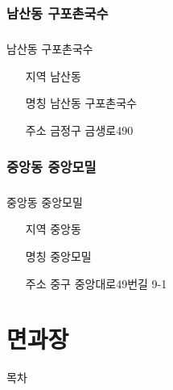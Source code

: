 \documentclass[aspectratio=1610,17pt,xcolor=pdftex,dvipsnames,table,handout]{beamer}
\begin{document}
		\section{ 남산동 구포촌국수	}
		\begin{frame} [t,plain]
		\frametitle{ }
			\begin{block} {	남산동 구포촌국수	}
			\setlength{\leftmargini}{4em}			
			\begin{itemize}
				\item [지역] 남산동	
				\item [명칭] 남산동 구포촌국수	
				\item [주소] 금정구 금생로490
			\end{itemize}
			\end{block}						
		\end{frame}						


		\section{ 중앙동 중앙모밀	}
		\begin{frame} [t,plain]
		\frametitle{ }
			\begin{block} {	중앙동 중앙모밀	}
			\setlength{\leftmargini}{4em}			
			\begin{itemize}
				\item [지역] 중앙동	
				\item [명칭] 중앙모밀	
				\item [주소] 중구 중앙대로49번길 9-1
			\end{itemize}
			\end{block}						
		\end{frame}						




		\part{ 면과장 }
		\frame{\partpage}

		\begin{frame} [plain]{목차}
		\tableofcontents%

\label{part2} 	%

		\end{frame}
		
\end{document}
